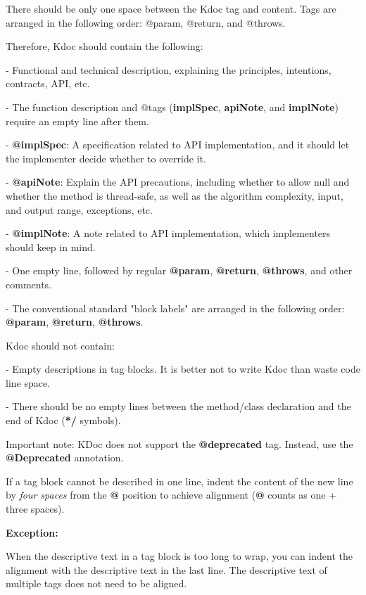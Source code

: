 {{{{{{{{{{{{{{{{\label{sec:2.1.3}



There should be only one space between the Kdoc tag and content. Tags are arranged in the following order: @param, @return, and @throws.



Therefore, Kdoc should contain the following:

- Functional and technical description, explaining the principles, intentions, contracts, API, etc.

- The function description and @tags (\textbf{implSpec}, \textbf{apiNote}, and \textbf{implNote}) require an empty line after them.

- \textbf{@implSpec}: A specification related to API implementation, and it should let the implementer decide whether to override it.

- \textbf{@apiNote}: Explain the API precautions, including whether to allow null and whether the method is thread-safe, as well as the algorithm complexity, input, and output range, exceptions, etc.

- \textbf{@implNote}: A note related to API implementation, which implementers should keep in mind.

- One empty line, followed by regular \textbf{@param}, \textbf{@return}, \textbf{@throws}, and other comments.

- The conventional standard "block labels" are arranged in the following order: \textbf{@param}, \textbf{@return}, \textbf{@throws}.

Kdoc should not contain:

- Empty descriptions in tag blocks. It is better not to write Kdoc than waste code line space.

- There should be no empty lines between the method/class declaration and the end of Kdoc (\textbf{*/} symbols).

Important note: KDoc does not support the \textbf{@deprecated} tag. Instead, use the \textbf{@Deprecated} annotation.

 

If a tag block cannot be described in one line, indent the content of the new line by \textit{four spaces} from the \textbf{@} position to achieve alignment (\textbf{@} counts as one + three spaces).

 

\textbf{Exception:}

 

When the descriptive text in a tag block is too long to wrap, you can indent the alignment with the descriptive text in the last line. The descriptive text of multiple tags does not need to be aligned.

}}}}}}}}}}}}}}}}
